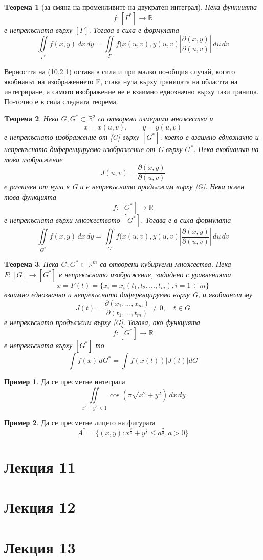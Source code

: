 \documentclass[a4paper,fleqn,12pt]{article}
\newtheorem{theorem}{Tеорема}[subsection]
\theoremstyle{definition}
\newtheorem{example}{Пример}[subsection]
\begin{document}
\begin{theorem}[за смяна на променливите на двукратен интеграл]
Нека функцията 
$$f: [\Gamma^*] \to \mathbb{R}$$
е непрекъсната върху $[\Gamma]$. Тогава в сила е формулата
$$\iint\limits_{\Gamma^*} f(x,y) \, dx \, dy = \iint\limits_{\Gamma} f(x(u,v),y(u,v) \left| \frac{\partial (x,y)}{\partial (u,v)} \right| \, du \, dv$$
\end{theorem}
Верността на (10.2.1) остава в сила и при малко по-общия случай, когато якобианът на изображението F, става нула върху границата на областта на интегриране, а самото изображение не е взаимно еднозначно върху тази граница. По-точно е в сила следната теорема.
\begin{theorem}
Нека $G,G^* \subset \mathbb{R}^2$ са отворени измерими множества и 
$$x = x(u,v), \qquad y = y(u,v)$$
е непрекъснато изображение от [G] върху $[G^*]$, което е взаимно еднозначно и непрекъснато диференцируемо изображение от G върху $G^*$. Нека якобианът на това изображение
$$J(u,v) = \frac{\partial (x,y)}{\partial (u,v)}$$
е различен от нула в G и е непрекъснато продължим върху [G]. Нека освен това функцията 
$$f: [G^*] \to \mathbb{R}$$
е непрекъсната върхи множеството $[G^*]$. Тогава е в сила формулата
$$\iint\limits_{G^*} f(x,y) \, dx \, dy = \iint\limits_{G} f(x(u,v),y(u,v) \left| \frac{\partial (x,y)}{\partial (u,v)} \right| \, du \, dv$$
\end{theorem}

\begin{theorem}
Нека $G,G^* \subset \mathbb{R}^m$ са отворени кубируеми множества. Нека $F: [G] \to [G^*] $ е непрекъснато изображение, зададено с уравненията 
$$x = F(t) = \{x_i = x_i(t_1,t_2, ..., t_m), i = 1 \div m \}$$
взаимно еднозначно и непрекъснато диференцируемо върху G, и якобианът му
$$J(t) = \frac{\partial (x_1, ..., x_m)}{\partial (t_1, ..., t_m)} \neq 0, \quad t \in G$$
е непрекъснато продължим върху [G]. Тогава, ако функцията 
$$f: [G^*] \to \mathbb{R}$$
е непрекъсната върху $[G^*]$ то
$$\int f(x) \, dG^* = \int f(x(t)) \vert J(t) \vert dG$$
\end{theorem}

\begin{example}
Да се пресметне интеграла
$$\iint\limits_{x^2+y^2 < 1} \cos (\pi \sqrt{x^2 + y^2}) \, dx \, dy$$
\end{example}

\begin{example}
Да се пресметне лицето на фигурата
$$A^* = \{(x,y) : x^{\frac{2}{3}} + y^{\frac{2}{3}} \leq a^{\frac{2}{3}}, a>0\}$$
\end{example}

\newpage
\section{Лекция 11}

\newpage
\section{Лекция 12}

\newpage
\section{Лекция 13}
\end{document}
